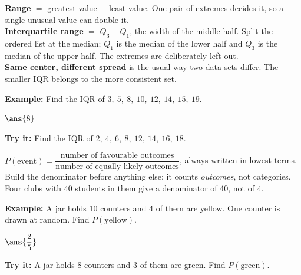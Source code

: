 \documentclass[12pt]{article}
\begin{document}
\begin{formulabox}
\textbf{Range} $=$ greatest value $-$ least value. One pair of extremes decides
it, so a single unusual value can double it.\\[3pt]
\textbf{Interquartile range} $=$ $Q_3 - Q_1$, the width of the middle half.
Split the ordered list at the median; $Q_1$ is the median of the lower half and
$Q_3$ is the median of the upper half. The extremes are deliberately left
out.\\[3pt]
\textbf{Same center, different spread} is the usual way two data sets differ.
The smaller IQR belongs to the more consistent set.
\end{formulabox}
\begin{examplebox}
\textbf{Example:} Find the IQR of $3,\ 5,\ 8,\ 10,\ 12,\ 14,\ 15,\ 19$.
\par
$\ans{8}$
\end{examplebox}
\begin{tryitbox}
\textbf{Try it:} Find the IQR of $2,\ 4,\ 6,\ 8,\ 12,\ 14,\ 16,\ 18$.\\[2pt]
\end{tryitbox}

\begin{formulabox}
$P(\text{event}) = \dfrac{\text{number of favourable outcomes}}{\text{number of
equally likely outcomes}}$, always written in lowest terms.\\[3pt]
Build the denominator before anything else: it counts \emph{outcomes}, not
categories. Four clubs with 40 students in them give a denominator of 40, not
of 4.
\end{formulabox}
\begin{examplebox}
\textbf{Example:} A jar holds 10 counters and 4 of them are yellow. One counter
is drawn at random. Find $P(\text{yellow})$.
\par
$\ans{\dfrac{2}{5}}$
\end{examplebox}
\begin{tryitbox}
\textbf{Try it:} A jar holds 8 counters and 3 of them are green. Find
$P(\text{green})$.\\[2pt]
\end{tryitbox}
\end{document}
